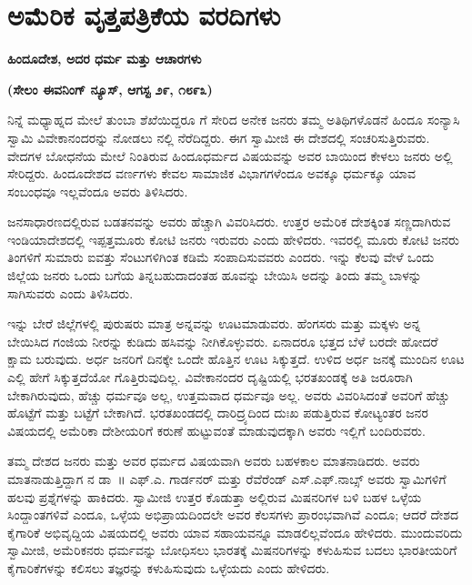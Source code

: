 
\chapter{ಅಮೆರಿಕ ವೃತ್ತಪತ್ರಿಕೆಯ ವರದಿಗಳು}

\begin{center}
\textbf{ಹಿಂದೂದೇಶ, ಅದರ ಧರ್ಮ ಮತ್ತು ಆಚಾರಗಳು}
\end{center}

\begin{center}
\textbf{(ಸೇಲಂ ಈವನಿಂಗ್​ ನ್ಯೂಸ್​, ಆಗಸ್ಟ ೨೯, ೧೮೯೩)}
\end{center}

\vskip -0.4cm

ನಿನ್ನೆ ಮಧ್ಯಾಹ್ನದ ಮೇಲೆ ತುಂಬಾ ಶೆಖೆಯಿದ್ದರೂ  ಗೆ ಸೇರಿದ ಅನೇಕ ಜನರು ತಮ್ಮ ಅತಿಥಿಗಳೊಡನೆ ಹಿಂದೂ ಸಂನ್ಯಾಸಿ ಸ್ವಾಮಿ ವಿವೇಕಾನಂದರನ್ನು ನೋಡಲು  ನಲ್ಲಿ ನೆರೆದಿದ್ದರು. ಈಗ ಸ್ವಾಮೀಜಿ ಈ ದೇಶದಲ್ಲಿ ಸಂಚರಿಸುತ್ತಿರುವರು. ವೇದಗಳ ಬೋಧನೆಯ ಮೇಲೆ ನಿಂತಿರುವ ಹಿಂದೂಧರ್ಮದ ವಿಷಯವನ್ನು ಅವರ ಬಾಯಿಂದ ಕೇಳಲು ಜನರು ಅಲ್ಲಿ ಸೇರಿದ್ದರು. ಹಿಂದೂದೇಶದ ವರ್ಣಗಳು ಕೇವಲ ಸಾಮಾಜಿಕ ವಿಭಾಗಗಳೆಂದೂ ಅವಕ್ಕೂ ಧರ್ಮಕ್ಕೂ ಯಾವ ಸಂಬಂಧವೂ ಇಲ್ಲವೆಂದೂ ಅವರು ತಿಳಿಸಿದರು.

ಜನಸಾಧಾರಣದಲ್ಲಿರುವ ಬಡತನವನ್ನು ಅವರು ಹೆಚ್ಚಾಗಿ ವಿವರಿಸಿದರು. ಉತ್ತರ ಅಮೆರಿಕ ದೇಶಕ್ಕಿಂತ ಸಣ್ಣದಾಗಿರುವ ಇಂಡಿಯಾದೇಶದಲ್ಲಿ ಇಪ್ಪತ್ತಮೂರು ಕೋಟಿ ಜನರು ಇರುವರು ಎಂದು ಹೇಳಿದರು. ಇವರಲ್ಲಿ ಮೂರು ಕೋಟಿ ಜನರು ತಿಂಗಳಿಗೆ ಸುಮಾರು ಐವತ್ತು ಸೆಂಟುಗಳಿಗಿಂತ ಕಡಿಮೆ ಸಂಪಾದಿಸುವವರು ಎಂದರು. ಇನ್ನು ಕೆಲವು ವೇಳೆ ಒಂದು ಜಿಲ್ಲೆಯ ಜನರು ಒಂದು ಬಗೆಯ ತಿನ್ನಬಹುದಾದಂತಹ ಹೂವನ್ನು ಬೇಯಿಸಿ ಅದನ್ನು ತಿಂದು ತಮ್ಮ ಬಾಳನ್ನು ಸಾಗಿಸುವರು ಎಂದು ತಿಳಿಸಿದರು.

ಇನ್ನು ಬೇರೆ ಜಿಲ್ಲೆಗಳಲ್ಲಿ ಪುರುಷರು ಮಾತ್ರ ಅನ್ನವನ್ನು ಊಟಮಾಡುವರು. ಹೆಂಗಸರು ಮತ್ತು ಮಕ್ಕಳು ಅನ್ನ ಬೇಯಿಸಿದ ಗಂಜಿಯ ನೀರನ್ನು ಕುಡಿದು ಹಸಿವನ್ನು ನೀಗಿಕೊಳ್ಳುವರು. ಏನಾದರೂ ಭತ್ತದ ಬೆಳೆ ಬರದೇ ಹೋದರೆ ಕ್ಷಾಮ ಬರುವುದು. ಅರ್ಧ ಜನರಿಗೆ ದಿನಕ್ಕೇ ಒಂದೇ ಹೊತ್ತಿನ ಊಟ ಸಿಕ್ಕುತ್ತದೆ. ಉಳಿದ ಅರ್ಧ ಜನಕ್ಕೆ ಮುಂದಿನ ಊಟ ಎಲ್ಲಿ ಹೇಗೆ ಸಿಕ್ಕುತ್ತದೆಯೋ ಗೊತ್ತಿರುವುದಿಲ್ಲ. ವಿವೇಕಾನಂದರ ದೃಷ್ಟಿಯಲ್ಲಿ ಭರತಖಂಡಕ್ಕೆ ಅತಿ ಜರೂರಾಗಿ ಬೇಕಾಗಿರುವುದು, ಹೆಚ್ಚು ಧರ್ಮವೂ ಅಲ್ಲ, ಉತ್ತಮವಾದ ಧರ್ಮವೂ ಅಲ್ಲ. ಅವರು ವಿವರಿಸಿದಂತೆ ಅವರಿಗೆ ಹೆಚ್ಚು ಹೊಟ್ಟೆಗೆ ಮತ್ತು ಬಟ್ಟೆಗೆ ಬೇಕಾಗಿದೆ. ಭರತಖಂಡದಲ್ಲಿ ದಾರಿದ್ರ್ಯದಿಂದ ದುಃಖ ಪಡುತ್ತಿರುವ ಕೋಟ್ಯಂತರ ಜನರ ವಿಷಯದಲ್ಲಿ ಅಮೆರಿಕಾ ದೇಶೀಯರಿಗೆ ಕರುಣೆ ಹುಟ್ಟುವಂತೆ ಮಾಡುವುದಕ್ಕಾಗಿ ಅವರು ಇಲ್ಲಿಗೆ ಬಂದಿರುವರು.

ತಮ್ಮ ದೇಶದ ಜನರು ಮತ್ತು ಅವರ ಧರ್ಮದ ವಿಷಯವಾಗಿ ಅವರು ಬಹಳಕಾಲ ಮಾತನಾಡಿದರು. ಅವರು ಮಾತನಾಡುತ್ತಿದ್ದಾಗ  ನ ಡಾ~॥ ಎಫ್​.ಎ. ಗಾರ್ಡನರ್​ ಮತ್ತು ರೆವೆರೆಂಡ್​ ಎಸ್​.ಎಫ್​.ನಾಬ್ಸ್​ ಅವರು ಸ್ವಾಮಿಗಳಿಗೆ ಹಲವು ಪ್ರಶ್ನೆಗಳನ್ನು ಹಾಕಿದರು. ಸ್ವಾಮೀಜಿ ಉತ್ತರ ಕೊಡುತ್ತಾ ಅಲ್ಲಿರುವ ಮಿಷನರಿಗಳ ಬಳಿ ಬಹಳ ಒಳ್ಳೆಯ ಸಿಂದ್ದಾಂತಗಳಿವೆ ಎಂದೂ, ಒಳ್ಳೆಯ ಅಭಿಪ್ರಾಯದಿಂದಲೇ ಅವರ ಕೆಲಸಗಳು ಪ್ರಾರಂಭವಾಗಿವೆ ಎಂದೂ; ಆದರೆ ದೇಶದ ಕೈಗಾರಿಕೆ ಅಭಿವೃದ್ದಿಯ ವಿಷಯದಲ್ಲಿ ಅವರು ಯಾವ ಸಹಾಯವನ್ನೂ ಮಾಡಲಿಲ್ಲವೆಂದೂ ಹೇಳಿದರು. ಮುಂದುವರಿದು ಸ್ವಾಮೀಜಿ, ಅಮೆರಿಕನರು ಧರ್ಮವನ್ನು ಬೋಧಿಸಲು ಭಾರತಕ್ಕೆ ಮಿಷನರಿಗಳನ್ನು ಕಳುಹಿಸುವ ಬದಲು ಭಾರತೀಯರಿಗೆ ಕೈಗಾರಿಕೆಗಳನ್ನು ಕಲಿಸಲು ತಜ್ಞರನ್ನು ಕಳುಹಿಸುವುದು ಒಳ್ಳೆಯದು ಎಂದು ಹೇಳಿದರು.

